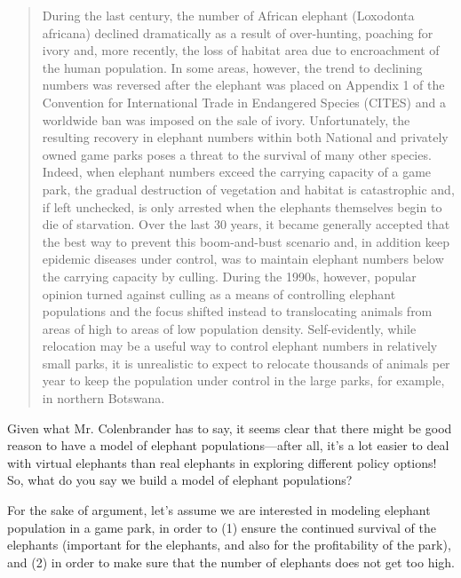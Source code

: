 \begin{quote}
During the last century, the number of African elephant (Loxodonta africana) 
declined dramatically as a result of over-hunting, poaching for ivory and, 
more recently, the loss of habitat area due to encroachment of the human population. 
In some areas, however, the trend to declining numbers was reversed after the elephant was 
placed on Appendix 1 of the Convention for International Trade in Endangered Species 
(CITES) and a worldwide ban was imposed on the sale of ivory. Unfortunately, the resulting 
recovery in elephant numbers within both National and privately owned game parks poses 
a threat to the survival of many other species. Indeed, when elephant numbers exceed the 
carrying capacity of a game park, the gradual destruction of vegetation and habitat is 
catastrophic and, if left unchecked, is only arrested when the elephants themselves
 begin to die of starvation. Over the last 30 years, it became generally accepted that 
 the best way to prevent this boom-and-bust scenario and, in addition keep epidemic 
 diseases under control, was to maintain elephant numbers below the carrying capacity 
 by culling. During the 1990s, however, popular opinion turned against culling as a 
 means of controlling elephant populations and the focus shifted instead to translocating 
 animals from areas of high to areas of low population density. Self-evidently, while 
 relocation may be a useful way to control elephant numbers in relatively small 
 parks, it is unrealistic to expect to relocate thousands of animals per year to keep the 
 population under control in the large parks, for example, in northern Botswana. \\
\end{quote}
 
Given what Mr. Colenbrander has to say, it seems clear that there might be good reason to have a model of elephant populations---after all, it's a lot easier to deal with virtual elephants than real elephants in exploring different policy options!  So, what do you say we build a model of elephant populations?

For the sake of argument, let's assume we are interested in modeling elephant population in a game park, in order to (1) ensure the continued survival of the elephants (important for the elephants, and also for the profitability of the park), and (2) in order to make sure that the number of elephants does not get too high.  


